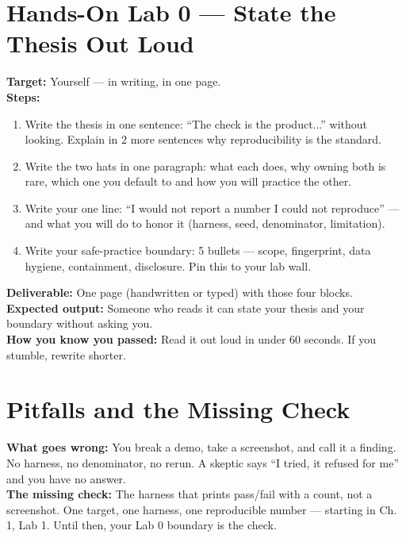 \section{Hands-On Lab 0 — State the Thesis Out Loud}
\begin{labbox}
\textbf{Target:} Yourself — in writing, in one page.\\[4pt]
\textbf{Steps:}
\begin{enumerate}
\item Write the thesis in one sentence: ``The check is the product...'' without looking. Explain in 2 more sentences why reproducibility is the standard.
\item Write the two hats in one paragraph: what each does, why owning both is rare, which one you default to and how you will practice the other.
\item Write your one line: ``I would not report a number I could not reproduce'' — and what you will do to honor it (harness, seed, denominator, limitation).
\item Write your safe-practice boundary: 5 bullets — scope, fingerprint, data hygiene, containment, disclosure. Pin this to your lab wall.
\end{enumerate}
\textbf{Deliverable:} One page (handwritten or typed) with those four blocks.\\
\textbf{Expected output:} Someone who reads it can state your thesis and your boundary without asking you.\\
\textbf{How you know you passed:} Read it out loud in under 60 seconds. If you stumble, rewrite shorter.
\end{labbox}

\section{Pitfalls and the Missing Check}
\begin{pitfallbox}
\textbf{What goes wrong:} You break a demo, take a screenshot, and call it a finding. No harness, no denominator, no rerun. A skeptic says ``I tried, it refused for me'' and you have no answer.\\[4pt]
\textbf{The missing check:} The harness that prints pass/fail with a count, not a screenshot. One target, one harness, one reproducible number — starting in Ch. 1, Lab 1. Until then, your Lab 0 boundary is the check.
\end{pitfallbox}

